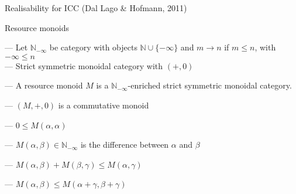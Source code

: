 \documentclass[xetex,serif,mathserif,aspectratio=169]{beamer}
\newcommand{\youtem}{\quad \textcolor{titlered!80}{---} \quad}
\newcommand{\HEAD}[1]{\textcolor{titlered}{#1}}
\begin{document}

\begin{frame}
  \HEAD{Realisability for ICC}
  \quad\qquad \textcolor{black!60}{(Dal Lago \& Hofmann, 2011)}


  \bigskip

  Resource monoids

  \bigskip

  \newcommand{\diffcat}{\mathbb{N}_{-\infty}}

  \youtem Let $\diffcat$ be category with objects
  $\mathbb{N} \cup \{-\infty\}$ and $m \to n$ if $m \leq n$, with
  $-\infty \leq n$ \\
  \quad \qquad\youtem Strict symmetric monoidal category with $(+, 0)$

  \medskip

  \youtem A resource monoid $M$ is a $\diffcat$-enriched strict
  symmetric monoidal category.

  \pause
  \bigskip

  \youtem $(M,+,0)$ is a commutative monoid

  \youtem $0 \leq M(\alpha,\alpha)$

  \youtem $M(\alpha, \beta) \in \diffcat$ is the difference between $\alpha$ and $\beta$

  \youtem $M(\alpha, \beta) + M(\beta, \gamma) \leq M(\alpha,\gamma)$

  \youtem $M(\alpha,\beta) \leq M(\alpha+\gamma,\beta+\gamma)$

\end{frame}
\end{document}
